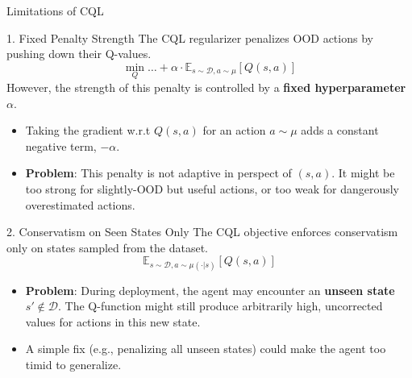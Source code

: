 \documentclass[11pt]{beamer}
\newcommand{\mc}[1]{\mathcal{#1}}
\begin{document}
\begin{frame}{Limitations of CQL}
    \begin{block}{1. Fixed Penalty Strength}
        The CQL regularizer penalizes OOD actions by pushing down their Q-values.
        \[
            \min_Q \dots + \alpha \cdot \mathbb{E}_{s \sim \mc{D}, a \sim \mu}[Q(s,a)]
        \]
        However, the strength of this penalty is controlled by a \textbf{fixed hyperparameter} $\alpha$.
        \begin{itemize}
            \item Taking the gradient w.r.t $Q(s,a)$ for an action $a \sim \mu$ adds a constant negative term, $-\alpha$.
            \item \textbf{Problem}: This penalty is not adaptive in perspect of $(s,a)$. It might be too strong for slightly-OOD but useful actions, or too weak for dangerously overestimated actions.
        \end{itemize}
    \end{block}

    \begin{block}{2. Conservatism on Seen States Only}
        The CQL objective enforces conservatism only on states sampled from the dataset.
        \[
            \mathbb{E}_{s \sim \mathcal{D}, a \sim \mu(\cdot|s)}[Q(s,a)]
        \]
        \begin{itemize}
            \item \textbf{Problem}: During deployment, the agent may encounter an \textbf{unseen state} $s' \notin \mathcal{D}$. The Q-function might still produce arbitrarily high, uncorrected values for actions in this new state.
            \item A simple fix (e.g., penalizing all unseen states) could make the agent too timid to generalize.
        \end{itemize}
    \end{block}
\end{frame}
\end{document}

